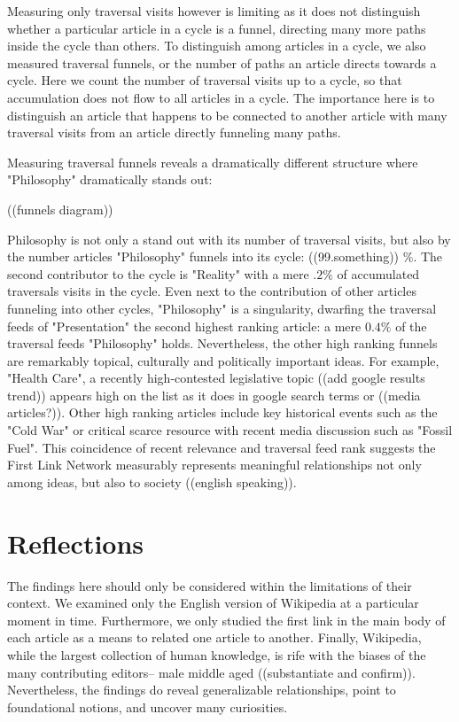 \documentclass[twoside]{article}
\begin{document}
Measuring only traversal visits however is limiting as it does not distinguish whether a particular article in a cycle 
is a funnel, directing many more paths inside the cycle than others. 
To distinguish among articles in a cycle, we also measured traversal funnels, or the number of 
paths an article directs towards a cycle. Here we count the number of traversal visits up to a cycle, 
so that accumulation does not flow to all articles in a cycle.
The importance here is to distinguish an article that happens to be connected to another article with many traversal visits 
from an article directly funneling many paths.

Measuring traversal funnels reveals a dramatically different structure where "Philosophy" dramatically stands out: 

((funnels diagram))

Philosophy is not only a stand out with its number of traversal visits, but also by the number articles "Philosophy" funnels into
its cycle: ((99.something)) $\%$. 
The second contributor to the cycle is "Reality" with a mere $.2\%$ of accumulated traversals visits in the cycle.
Even next to the contribution of other articles funneling into other cycles, "Philosophy" is a singularity, dwarfing
the traversal feeds of "Presentation" the second highest ranking article: 
a mere $0.4\%$ of the traversal feeds "Philosophy" holds.
Nevertheless, the other high ranking funnels are remarkably topical, culturally and politically important ideas.  For example, "Health Care", a recently high-contested legislative topic ((add google results trend)) appears high on the list
as it does in google search terms or ((media articles?)).
Other high ranking articles include key historical events such as the "Cold War" or critical scarce resource with recent 
media discussion such as "Fossil Fuel".
This coincidence of recent relevance and traversal feed rank suggests the First Link Network measurably represents
meaningful relationships not only among ideas, but also to society ((english speaking)). 


\section{Reflections}

The findings here should only be considered within the limitations of their context.
We examined only the English version of Wikipedia at a particular moment in time.
Furthermore, we only studied the first link in the main body of each article
as a means to related one article to another. Finally, Wikipedia, while the largest 
collection of human knowledge, is rife with the biases of the many contributing editors--
male middle aged ((substantiate and confirm)). Nevertheless, the findings do reveal
generalizable relationships, point to foundational notions, and uncover many curiosities.
\end{document}
